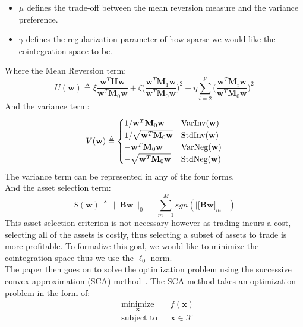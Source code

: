 \begin{itemize}
    \item $\mu$ defines the trade-off between the mean reversion measure and the variance preference.
    \item $\gamma$ defines the regularization parameter of how sparse we would like the cointegration space to be.
\end{itemize}

\noindent Where the Mean Reversion term: $$U(\mathbf{w}) \triangleq \xi \frac{\mathbf{w}^T \mathbf{H}\mathbf{w}}{\mathbf{w}^T \mathbf{M}_0\mathbf{w}} + \zeta \biggl( \frac{\mathbf{w}^T \mathbf{M}_1\mathbf{w}}{\mathbf{w}^T \mathbf{M}_0\mathbf{w}} \biggr) ^2 + \eta \sum_{i=2}^{p} \biggl( \frac{\mathbf{w}^T \mathbf{M}_i\mathbf{w}}{\mathbf{w}^T \mathbf{M}_0\mathbf{w}}\biggr)^2$$ And the variance term: $$V(\mathbf{w}) \triangleq \begin{cases}
        1/\mathbf{w}^T \mathbf{M}_0\mathbf{w}        & \text{VarInv(\textbf{w})} \\
        1/\sqrt{\mathbf{w}^T \mathbf{M}_0\mathbf{w}} & \text{StdInv(\textbf{w})} \\
        -\mathbf{w}^T \mathbf{M}_0\mathbf{w}         & \text{VarNeg(\textbf{w})} \\
        -\sqrt{\mathbf{w}^T \mathbf{M}_0\mathbf{w}}  & \text{StdNeg(\textbf{w})}
    \end{cases}$$
The variance term can be represented in any of the four forms.
\\[5mm]
And the asset selection term: $$S(\mathbf{w}) \triangleq \big\| \mathbf{B} \mathbf{w}\big\|_0 = \sum_{m=1}^{M} sgn(\mid \bigl[ \mathbf{B} \mathbf{w} \bigr]_m \mid)$$ This asset selection criterion is not necessary however as trading incurs a cost, selecting all of the assets is costly, thus selecting a subset of assets to trade is more profitable. To formalize this goal, we would like to minimize the cointegration space thus we use the $\ell_0$ norm.
\\[5mm]
The paper then goes on to solve the optimization problem using the successive convex approximation (SCA) method~\cite{scaOptimization}. The SCA method takes an optimization problem in the form of:
\begin{equation*}
    \begin{aligned}
         & \underset{\mathbf{x}}{\text{minimize}}
         &                                        & f(\mathbf{x})              \\
         & \text{subject to}
         &                                        & \mathbf{x} \in \mathcal{X}
    \end{aligned}
\end{equation*}
